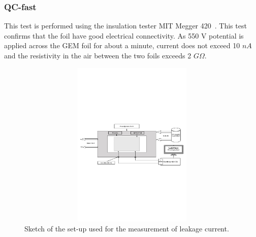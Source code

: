 \subsubsection{QC-fast} %
\label{ssub:qc_fast}
This test is performed using the insulation tester MIT Megger 420~\cite{twelve}. This test confirms that the foil have good electrical connectivity. As 550 V potential is applied across the GEM foil for about a minute, current does not exceed 10 $nA$ and the resistivity in the air between the two foils exceeds 2 $G\Omega$.
\begin{figure}[!htbp]
    \centering
        \includegraphics[width=12cm,height=8cm]{figures/GEM/figures/10.pdf}
   \caption{Sketch of the set-up used for the measurement of leakage current.} \label{fig:Cleaning_Measurement}
\end{figure}
